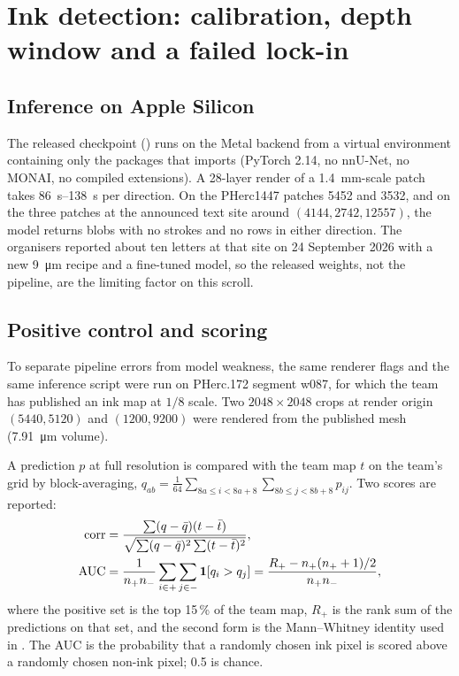 \section{Ink detection: calibration, depth window and a failed lock-in}
\label{sec:ink}

\subsection{Inference on Apple Silicon}
The released  checkpoint () runs on the Metal backend from a virtual environment containing only the packages that  imports (PyTorch 2.14, no nnU-Net, no MONAI, no compiled extensions). A 28-layer render of a \SI{1.4}{mm}-scale patch takes \SIrange{86}{138}{s} per direction. On the PHerc1447 patches 5452 and 3532, and on the three patches at the announced text site around $(4144,2742,12557)$, the model returns blobs with no strokes and no rows in either direction. The organisers reported about ten letters at that site on 24 September 2026 with a new \SI{9}{\um} recipe and a fine-tuned model, so the released weights, not the pipeline, are the limiting factor on this scroll.

\subsection{Positive control and scoring}
To separate pipeline errors from model weakness, the same renderer flags and the same inference script were run on PHerc.172 segment w087, for which the team has published an ink map at $1/8$ scale. Two $2048\times2048$ crops at render origin $(5440,5120)$ and $(1200,9200)$ were rendered from the published mesh (\SI{7.91}{\um} volume).

A prediction $p$ at full resolution is compared with the team map $t$ on the team's grid by block-averaging, $q_{ab}=\frac1{64}\sum_{8a\le i<8a+8}\sum_{8b\le j<8b+8}p_{ij}$. Two scores are reported:
\begin{align}
\operatorname{corr} &=\frac{\sum(q-\bar q)(t-\bar t)}{\sqrt{\sum(q-\bar q)^{2}\sum(t-\bar t)^{2}}},\label{eq:corr}\\
\operatorname{AUC} &=\frac{1}{n_{+}n_{-}}\sum_{i\in+}\sum_{j\in-}\mathbf 1[q_i>q_j]
=\frac{R_{+}-n_{+}(n_{+}+1)/2}{n_{+}n_{-}},\label{eq:auc}
\end{align}
where the positive set is the top 15\,\% of the team map, $R_{+}$ is the rank sum of the predictions on that set, and the second form is the Mann--Whitney identity used in . The AUC is the probability that a randomly chosen ink pixel is scored above a randomly chosen non-ink pixel; 0.5 is chance.

